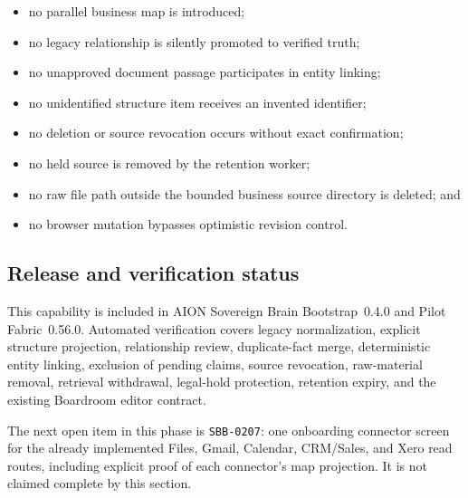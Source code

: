 \begin{itemize}
  \item no parallel business map is introduced;
  \item no legacy relationship is silently promoted to verified truth;
  \item no unapproved document passage participates in entity linking;
  \item no unidentified structure item receives an invented identifier;
  \item no deletion or source revocation occurs without exact confirmation;
  \item no held source is removed by the retention worker;
  \item no raw file path outside the bounded business source directory is
        deleted; and
  \item no browser mutation bypasses optimistic revision control.
\end{itemize}

\subsection{Release and verification status}

This capability is included in AION Sovereign Brain Bootstrap~0.4.0 and Pilot
Fabric~0.56.0.  Automated verification covers legacy normalization, explicit
structure projection, relationship review, duplicate-fact merge, deterministic
entity linking, exclusion of pending claims, source revocation, raw-material
removal, retrieval withdrawal, legal-hold protection, retention expiry, and the
existing Boardroom editor contract.

The next open item in this phase is \texttt{SBB-0207}: one onboarding connector
screen for the already implemented Files, Gmail, Calendar, CRM/Sales, and Xero
read routes, including explicit proof of each connector's map projection.  It is
not claimed complete by this section.
